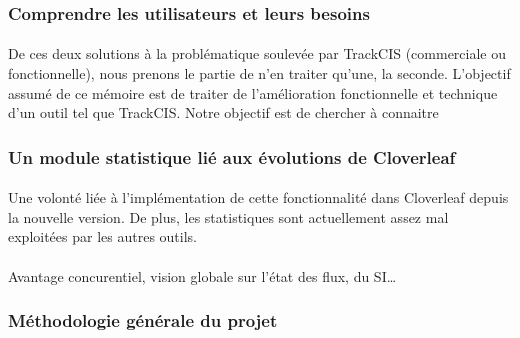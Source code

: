 		\subsubsection{Comprendre les utilisateurs et leurs besoins}
			\paragraph{}%
			De ces deux solutions à la problématique soulevée par TrackCIS (commerciale
			ou fonctionnelle), nous prenons le partie de n'en traiter qu'une, la
			seconde.\newline
			L'objectif assumé de ce mémoire est de traiter de l'amélioration
			fonctionnelle et technique d'un outil tel que TrackCIS. Notre objectif est de
			chercher à connaitre
			
			\paragraph{}%
			
			\paragraph{}%
			
		\subsubsection{Un module statistique lié aux évolutions de Cloverleaf}
			\paragraph{}%
			Une volonté liée à l'implémentation de cette fonctionnalité dans Cloverleaf depuis 
			la nouvelle version. De plus, les statistiques sont actuellement assez mal 
			exploitées par les autres outils.
			
			\paragraph{}%
			Avantage concurentiel, vision globale sur l'état des flux, du SI\ldots
			
		\subsubsection{Méthodologie générale du projet}
			\paragraph{}%
			
			
			\paragraph{}%
			
			
			\paragraph{}%
			